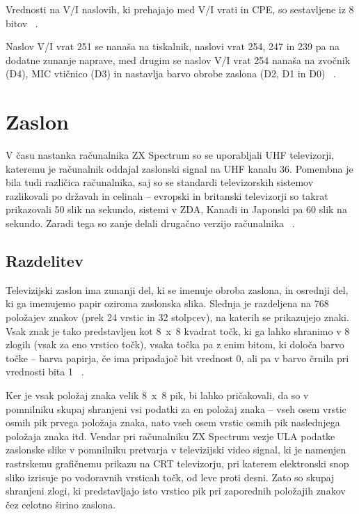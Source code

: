 \documentclass[a4paper, 12pt, openright]{book}
\begin{document}
    Vrednosti na V/I naslovih, ki prehajajo med V/I vrati in CPE, so sestavljene
    iz 8 bitov ~\cite{strojnijezikzaprocesorz80, zxspectrumbasicprogramming}.

    Naslov V/I vrat 251 se nanaša na tiskalnik, naslovi vrat 254, 247 in 239 pa na
    dodatne zunanje naprave, med drugim se naslov V/I vrat 254 nanaša na zvočnik
    (D4), MIC vtičnico (D3) in nastavlja barvo obrobe zaslona (D2, D1 in D0) ~\cite{zxspectrumbasicprogramming}.

    \section{Zaslon}
    V času nastanka računalnika ZX Spectrum so se uporabljali UHF televizorji,
    kateremu je računalnik oddajal zaslonski signal na UHF kanalu 36. Pomembna
    je bila tudi različica računalnika, saj so se standardi televizorskih sistemov
    razlikovali po državah in celinah -- evropski in britanski televizorji so
    takrat prikazovali 50 slik na sekundo, sistemi v ZDA, Kanadi in Japonski pa
    60 slik na sekundo. Zaradi tega so zanje delali drugačno verzijo računalnika ~\cite{zxspectrumintroduction}.

    \subsection{Razdelitev}
    Televizijski zaslon ima zunanji del, ki se imenuje obroba zaslona, in
    osrednji del, ki ga imenujemo papir oziroma zaslonska slika. Slednja je
    razdeljena na 768 položajev znakov (prek 24 vrstic in 32 stolpcev), na katerih
    se prikazujejo znaki. Vsak znak je tako predstavljen kot 8~x~8 kvadrat točk, ki
    ga lahko shranimo v 8 zlogih (vsak za eno vrstico točk), vsaka točka pa z
    enim bitom, ki določa barvo točke -- barva papirja, če ima pripadajoč bit vrednost
    0, ali pa v barvo črnila pri vrednosti bita 1 ~\cite{zxspectrumbasicprogramming,
    zxspectrumintroduction}.

    Ker je vsak položaj znaka velik 8~x~8 pik, bi lahko pričakovali, da so v pomnilniku
    skupaj shranjeni vsi podatki za en položaj znaka -- vseh osem vrstic osmih
    pik prvega položaja znaka, nato vseh osem vrstic osmih pik naslednjega položaja
    znaka itd. Vendar pri računalniku ZX Spectrum vezje ULA podatke zaslonske
    slike v pomnilniku pretvarja v televizijski video signal, ki je namenjen rastrskemu
    grafičnemu prikazu na CRT televizorju, pri katerem elektronski snop sliko
    izrisuje po vodoravnih vrsticah točk, od leve proti desni. Zato so skupaj
    shranjeni zlogi, ki predstavljajo isto vrstico pik pri zaporednih položajih znakov
    čez celotno širino zaslona.
\end{document}
